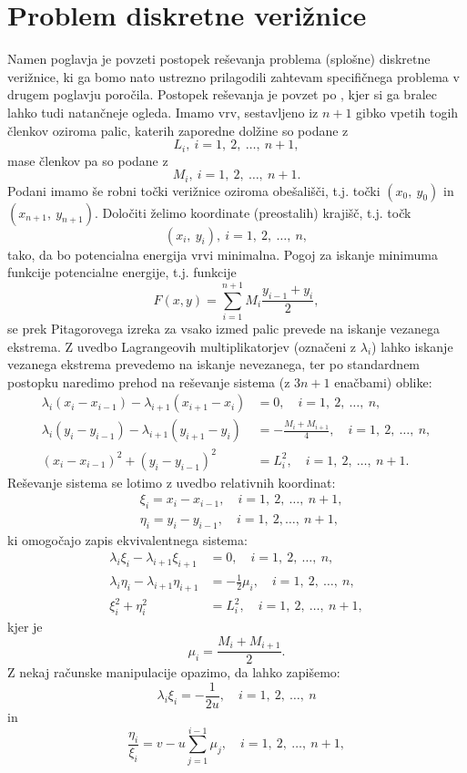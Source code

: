 \documentclass{article}
\begin{document}
\section{Problem diskretne verižnice}
Namen poglavja je povzeti postopek reševanja problema (splošne) diskretne verižnice, ki ga bomo nato ustrezno prilagodili zahtevam specifičnega problema v drugem poglavju poročila. 
Postopek reševanja je povzet po \cite{clanek}, kjer si ga bralec lahko tudi natančneje ogleda.
\newline
Imamo vrv, sestavljeno iz $n+1$ gibko vpetih togih členkov oziroma palic, katerih zaporedne dolžine so podane z
$$
L_{i},~i=1,~2,~ \ldots, ~n+1,
$$
mase členkov pa so podane z
$$
M_{i},~i=1,~2,~ \ldots, ~n+1.
$$
Podani imamo še robni točki verižnice oziroma obešališči, t.j. točki $(x_0,~y_0)$ in $(x_{n+1},~y_{n+1})$.
\newline
Določiti želimo koordinate (preostalih) krajišč, t.j. točk
$$
(x_{i},~y_{i}),~i=1,~2,~\ldots,~n,
$$
tako, da bo potencialna energija vrvi minimalna.
Pogoj za iskanje minimuma funkcije potencialne energije, t.j. funkcije
$$
F(x, y)=\sum_{i=1}^{n+1} M_{i} \frac{y_{i-1}+y_{i}}{2},
$$
se prek Pitagorovega izreka za vsako izmed palic prevede na iskanje vezanega ekstrema. 
Z uvedbo Lagrangeovih multiplikatorjev (označeni z $\lambda_{i}$) lahko iskanje vezanega ekstrema prevedemo na iskanje nevezanega, ter po standardnem postopku naredimo prehod na reševanje sistema (z $3n +1$ enačbami) oblike:
$$
\begin{aligned}
\lambda_{i}\left(x_{i}-x_{i-1}\right)-\lambda_{i+1}\left(x_{i+1}-x_{i}\right) & =0, \quad i=1,~2,~\ldots,~n, \\
\lambda_{i}\left(y_{i}-y_{i-1}\right)-\lambda_{i+1}\left(y_{i+1}-y_{i}\right) & =-\frac{M_{i}+M_{i+1}}{4}, \quad i=1,~2, ~\ldots, ~n, \\
\left(x_{i}-x_{i-1}\right)^{2}+\left(y_{i}-y_{i-1}\right)^{2} & =L_{i}^{2}, \quad i=1,~2,~\ldots,~n+1 .
\end{aligned}
$$
Reševanje sistema se lotimo z uvedbo relativnih koordinat:
$$
\begin{aligned}
& \xi_{i}=x_{i}-x_{i-1}, \quad i=1,~2,~\ldots,~n+1, \\
& \eta_{i}=y_{i}-y_{i-1}, \quad i=1,~2, \ldots,~n+1 \text {, }
\end{aligned}
$$
ki omogočajo zapis ekvivalentnega sistema:
$$
\begin{aligned}
\lambda_{i} \xi_{i}-\lambda_{i+1} \xi_{i+1} & =0, \quad i=1,~2, ~\ldots, ~n, \\
\lambda_{i} \eta_{i}-\lambda_{i+1} \eta_{i+1} & =-\frac{1}{2} \mu_{i}, \quad i=1,~2,~ \ldots,~ n, \\
\xi_{i}^{2}+\eta_{i}^{2} & =L_{i}^{2}, \quad i=1,~2, ~\ldots, ~n+1,
\end{aligned}
$$
kjer je
$$
\mu_{i}=\frac{M_{i}+M_{i+1}}{2}.
$$
Z nekaj računske manipulacije opazimo, da lahko zapišemo:
$$
\lambda_{i} \xi_{i}=-\frac{1}{2 u}, \quad i=1,~2,~\ldots,~n
$$
in
\begin{equation}
    \label{sim_lih}
    \frac{\eta_{i}}{\xi_{i}}=v-u \sum_{j=1}^{i-1} \mu_{j}, \quad i=1,~2,~\ldots,~n+1,
\end{equation}
\end{document}
